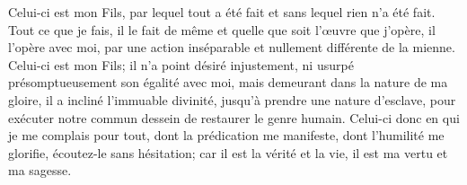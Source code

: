 Celui-ci est mon Fils,
	par lequel tout a été fait et sans lequel rien n’a été fait.
Tout ce que je fais, il le fait de même
	et quelle que soit l’œuvre que j’opère, il l’opère avec moi,
	par une action inséparable et nullement différente de la mienne.
Celui-ci est mon Fils;
	il n’a point désiré injustement,
		ni usurpé présomptueusement son égalité avec moi,
	mais demeurant dans la nature de ma gloire,
	il a incliné l’immuable divinité,
	jusqu’à prendre une nature d’esclave,
	pour exécuter notre commun dessein de restaurer le genre humain.
Celui-ci donc en qui je me complais pour tout,
	dont la prédication me manifeste, dont l’humilité me glorifie,
	écoutez-le sans hésitation;
	car il est la vérité et la vie, il est ma vertu et ma sagesse.
